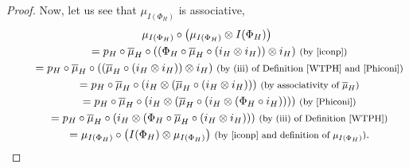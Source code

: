 \documentclass[pdftex]{sigma}
\numberwithin{equation}{section}
\begin{document}
\begin{proof}
Now, let us see that $\mu_{I(\Phi_{H})}$ is associative,
\begin{gather*}
\mu_{I(\Phi_{H})}\circ\bigl(\mu_{I(\Phi_{H})}\otimes I(\Phi_{H})\bigr)\\
\qquad{}= p_{H}\circ\overline{\mu}_{H}\circ((\Phi_{H}\circ\overline{\mu}_{H}\circ(i_{H}\otimes i_{H}))\otimes i_{H})\ \text{\footnotesize\textnormal{(by \eqref{iconp})}}\\
\qquad{}= p_{H}\circ\overline{\mu}_{H}\circ((\overline{\mu}_{H}\circ(i_{H}\otimes i_{H}))\otimes i_{H})\ \text{\footnotesize\textnormal{(by (iii) of Definition \ref{WTPH} and \eqref{Phiconi})}}\\
\qquad{}= p_{H}\circ\overline{\mu}_{H}\circ(i_{H}\otimes(\overline{\mu}_{H}\circ(i_{H}\otimes i_{H})))\ \text{\footnotesize\textnormal{(by associativity of $\overline{\mu}_{H}$)}}\\
\qquad{}= p_{H}\circ\overline{\mu}_{H}\circ(i_{H}\otimes(\overline{\mu}_{H}\circ(i_{H}\otimes (\Phi_{H}\circ i_{H}))))\ \text{\footnotesize\textnormal{(by \eqref{Phiconi})}}\\
\qquad{}= p_{H}\circ\overline{\mu}_{H}\circ(i_{H}\otimes(\Phi_{H}\circ \overline{\mu}_{H}\circ(i_{H}\otimes i_{H})))\ \text{\footnotesize\textnormal{(by (iii) of Definition \ref{WTPH})}}\\
\qquad{}= \mu_{I(\Phi_{H})}\circ\bigl(I(\Phi_{H})\otimes\mu_{I(\Phi_{H})}\bigr)\ \text{\footnotesize\textnormal{(by \eqref{iconp} and definition of $\mu_{I(\Phi_{H})}$)}}.
\end{gather*}


\end{proof}
\end{document}
